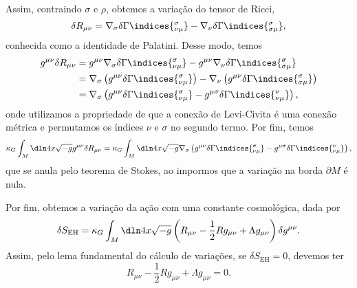 Assim, contraindo \(\sigma\) e \(\rho\), obtemos a variação do tensor de Ricci,
\begin{equation*}
    \delta R_{\mu\nu} = \nabla_{\sigma} \delta \Gamma\indices{^\sigma_{\nu \mu}} - \nabla_{\nu}\delta \Gamma\indices{^\sigma_{\sigma \mu}},
\end{equation*}
conhecida como a identidade de Palatini. Desse modo, temos
\begin{align*}
    g^{\mu\nu}\delta R_{\mu\nu} &= g^{\mu\nu}\nabla_{\sigma} \delta \Gamma\indices{^\sigma_{\nu \mu}} - g^{\mu\nu}\nabla_{\nu}\delta \Gamma\indices{^\sigma_{\sigma \mu}}\\
                                &= \nabla_{\sigma}\left(g^{\mu\nu}\delta \Gamma\indices{^\sigma_{\nu\mu}}\right)- \nabla_{\nu}\left(g^{\mu\nu}\delta \Gamma\indices{^\sigma_{\sigma \mu}}\right)\\
                                &= \nabla_{\sigma}\left(g^{\mu\nu}\delta \Gamma\indices{^\sigma_{\nu\mu}}- g^{\mu\sigma}\delta \Gamma\indices{^\nu_{\nu \mu}}\right),
\end{align*}
onde utilizamos a propriedade de que a conexão de Levi-Civita é uma conexão métrica e permutamos os índices \(\nu \) e \(\sigma\) no segundo termo. Por fim, temos
\begin{equation*}
    \kappa_G \int_M \dln4x \sqrt{-g} g^{\mu\nu}\delta R_{\mu\nu} = \kappa_G \int_M \dln4x\sqrt{-g} \nabla_{\sigma}\left(g^{\mu\nu}\delta \Gamma\indices{^\sigma_{\nu\mu}}- g^{\mu\sigma}\delta \Gamma\indices{^\nu_{\nu \mu}}\right),
\end{equation*}
que se anula pelo teorema de Stokes, ao impormos que a variação na borda \(\partial M\) é nula.

Por fim, obtemos a variação da ação com uma constante cosmológica, dada por
\begin{equation*}
    \delta S_\mathrm{EH} = \kappa_G \int_M \dln4x \sqrt{-g} \left(R_{\mu\nu} - \frac12Rg_{\mu\nu} + \Lambda g_{\mu\nu}\right) \delta g^{\mu\nu}.
\end{equation*}
Assim, pelo lema fundamental do cálculo de variações, se \(\delta S_\mathrm{EH} = 0\), devemos ter
\begin{equation*}
    R_{\mu\nu} - \frac12 R g_{\mu\nu} + \Lambda g_{\mu\nu} = 0.
\end{equation*}
